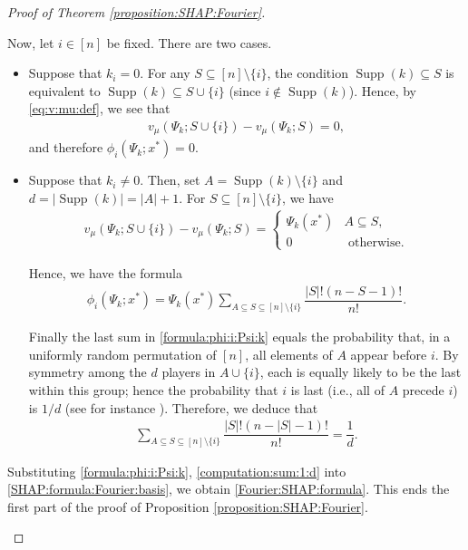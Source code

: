 \documentclass[letterpaper,11pt]{article}
\numberwithin{equation}{section}
\newcommand{\supp}{\operatorname{Supp}}
\numberwithin{equation}{section}
\begin{document}
\begin{proof}[Proof of Theorem \ref{proposition:SHAP:Fourier}]
\begin{itemize}
    Now, let $i\in [n]$ be fixed. There are two cases.
    \begin{itemize}
        \item[$\bullet$] Suppose that $k_i=0$. For any $S\subseteq [n]\setminus \{i\}$, the condition $\supp(k)\subseteq S$ is equivalent to $\supp(k)\subseteq S\cup \{i\}$ (since $i\notin \supp (k)$). Hence, by \eqref{eq:v:mu:def}, we see that 
        \begin{align*}
            v_\mu(\Psi_k;S\cup \{i\}) - v_\mu (\Psi_k;S)=0,
        \end{align*}
        and therefore $\phi_i(\Psi_k;x^*)=0$.
        \item[$\bullet$] Suppose that $k_i\neq 0$. Then, set $A=\supp(k)\setminus \{i\}$ and $d=|\supp(k)|=|A|+1$. For $S\subseteq [n]\setminus \{i\}$, we have 
        \begin{align*}
            v_\mu (\Psi_k; S\cup \{i\}) - v_\mu (\Psi_k; S)=\begin{cases}
                \Psi_k(x^*)& A\subseteq S,\\
                0&\text{ otherwise.}
            \end{cases}
        \end{align*}

        Hence, we have the formula 
        \begin{align}
            \label{formula:phi:i:Psi:k}
            \phi_i(\Psi_k; x^*)=\Psi_k(x^*)\sum_{A\subseteq S \subseteq [n]\setminus \{i\}} \dfrac{|S|! (n-S-1)!}{n!}.
        \end{align}

        Finally the last sum in \eqref{formula:phi:i:Psi:k} equals the probability that, in a uniformly random permutation of $[n]$, all elements of $A$ appear before $i$. By symmetry among the $d$ players in $A\cup \{i\}$, each is equally likely to be the last within this group; hence the probability that $i$ is last (i.e., all of $A$ precede $i$) is $1/d$ (see for instance \cite{shapley1953value}). Therefore, we deduce that 
        \begin{align}
            \label{computation:sum:1:d}
            \sum_{A\subseteq S \subseteq [n]\setminus \{i\}} \dfrac{|S|! (n-|S|-1)!}{n!}=\dfrac{1}{d}.
        \end{align}
    \end{itemize}

    Substituting \eqref{formula:phi:i:Psi:k}, \eqref{computation:sum:1:d} into \eqref{SHAP:formula:Fourier:basis}, we obtain \eqref{Fourier:SHAP:formula}. This ends the first part of the proof of Proposition \ref{proposition:SHAP:Fourier}.
    

\end{itemize}
\end{proof}
\end{document}
